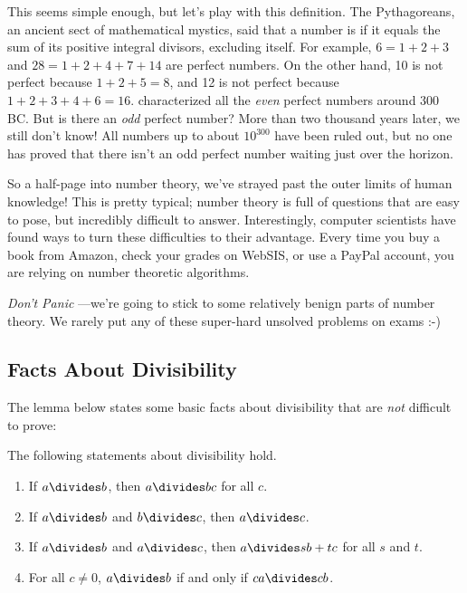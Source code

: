 This seems simple enough, but let's play with this definition.  The
Pythagoreans, an ancient sect of mathematical mystics, said that a number
is  if it equals the sum of its
positive integral divisors, excluding itself.  For example, $6 = 1 + 2 +
3$ and $28 = 1 + 2 + 4 + 7 + 14$ are perfect numbers.  On the other hand,
10 is not perfect because $1 + 2 + 5 = 8$, and 12 is not perfect because
$1 + 2 + 3 + 4 + 6 = 16$.   characterized all the \emph{even}
perfect numbers around 300 BC.  But is there an \emph{odd} perfect number?
More than two thousand years later, we still don't know!  All numbers up
to about $10^{300}$ have been ruled out, but no one has proved that there
isn't an odd perfect number waiting just over the horizon.

So a half-page into number theory, we've strayed past the outer limits of
human knowledge!  This is pretty typical; number theory is full of
questions that are easy to pose, but incredibly difficult to answer.
Interestingly, computer scientists have found ways to turn these
difficulties to their advantage.  Every time you buy a book from Amazon,
check your grades on WebSIS, or use a PayPal account, you are relying on
number theoretic algorithms.

\emph{Don't Panic} ---we're going to stick to some relatively benign parts
of number theory.  We rarely put any of these super-hard unsolved problems
on exams :-)

\subsection{Facts About Divisibility}

The lemma below states some basic facts about divisibility that are
\emph{not} difficult to prove:

\begin{lemma}
\label{lem:div}
The following statements about divisibility hold.
%
\begin{enumerate}
\item If $a \divides b$, then $a \divides bc$ for all $c$.
\item If $a \divides b$ and $b \divides c$, then $a \divides c$.
\item If $a \divides b$ and $a \divides c$, then $a \divides sb + tc$ for all $s$ and $t$.
\item For all $c \neq 0$, $a \divides b$ if and only if $ca \divides cb$.
\end{enumerate}
\end{lemma}

